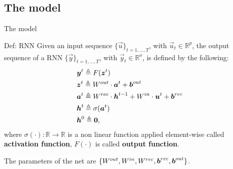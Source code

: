 
\subsection{The model}
\begin{frame}{The model}
	
\begin{block}{Def: RNN}
	Given an input sequence $\{\vec{u}\}_{t=1,...,T}$, with $ \vec{u}_t \in \mathbb{R}^p$, the output sequence of a RNN $\{\vec{y}\}_{t=1,...,T}$, with $\vec{y}_t \in \mathbb{R}^o$,  is defined by the following:
\begin{align}
		&\boldsymbol{y}^t \triangleq F(\boldsymbol{z}^t)\\
		&\boldsymbol{z}^t \triangleq W^{out}\cdot\boldsymbol{a}^t + \boldsymbol{b}^{out}\\
		&\boldsymbol{a}^t \triangleq W^{rec}\cdot\boldsymbol{h}^{t-1}+W^{in}\cdot\boldsymbol{u}^t+\boldsymbol{b}^{rec}\\
		&\boldsymbol{h}^t \triangleq  \sigma(\boldsymbol{a}^t) \\
		&\boldsymbol{h}^0 \triangleq \boldsymbol{0},
\end{align}
where $\sigma(\cdot):\mathbb{R}\rightarrow\mathbb{R}$ is a non linear function applied element-wise called \textbf{activation function}, $F(\cdot)$ is called \textbf{output function}. 
\end{block}

\begin{block}{}
	The parameters of the net are $\{W^{out}, W^{in},  W^{rec}, \boldsymbol{b}^{rec}, \boldsymbol{b}^{out}\}$.
\end{block}
\end{frame}

